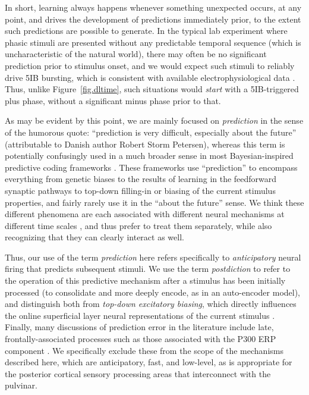 \documentclass[11pt,twoside]{article}
\newif\myifpdf
\begin{document}
In short, learning always happens whenever something unexpected occurs, at any point, and drives the development of predictions immediately prior, to the extent such predictions are possible to generate.  In the typical lab experiment where phasic stimuli are presented without any predictable temporal sequence (which is uncharacteristic of the natural world), there may often be no significant prediction prior to stimulus onset, and we would expect such stimuli to reliably drive 5IB bursting, which is consistent with available electrophysiological data \citep{Bender82,PetersenRobinsonKeys85,BenderYouakim01,Robinson93,LuczakBarthoHarris09,LuczakBarthoHarris13,KomuraNikkuniHirashimaEtAl13,ZhouSchaferDesimone16}.  Thus, unlike Figure~\ref{fig.dltime}, such situations would \emph{start} with a 5IB-triggered plus phase, without a significant minus phase prior to that.

As may be evident by this point, we are mainly focused on \emph{prediction} in the sense of the humorous quote: ``prediction is very difficult, especially about the future'' (attributable to Danish author Robert Storm Petersen), whereas this term is potentially confusingly used in a much broader sense in most Bayesian-inspired predictive coding frameworks \citep{RaoBallard99,Friston05,deLangeHeilbronKok18}.
These frameworks use ``prediction'' to encompass everything from genetic biases to the results of learning in the feedforward synaptic pathways to top-down filling-in or biasing of the current stimulus properties, and fairly rarely use it in the ``about the future'' sense.   We think these different phenomena are each associated with different neural mechanisms at different time scales \citep{OReillyHazyHerd16,OReillyWyatteHerdEtAl13,OReillyMunakataFrankEtAl12}, and thus prefer to treat them separately, while also recognizing that they can clearly interact as well.

Thus, our use of the term \emph{prediction} here refers specifically to \emph{anticipatory} neural firing that predicts subsequent stimuli.  We use the term \emph{postdiction} to refer to the operation of this predictive mechanism after a stimulus has been initially processed (to consolidate and more deeply encode, as in an auto-encoder model), and distinguish both from \emph{top-down excitatory biasing}, which directly influences the online superficial layer neural representations of the current stimulus \citep{DesimoneDuncan95,ReynoldsChelazziDesimone99,MillerCohen01,OReillyWyatteHerdEtAl13}.  Finally, many discussions of prediction error in the literature include late, frontally-associated processes such as those associated with the P300 ERP component \citep{HolroydColes02}.  We specifically exclude these from the scope of the mechanisms described here, which are anticipatory, fast, and low-level, as is appropriate for the posterior cortical sensory processing areas that interconnect with the pulvinar.
\end{document}

